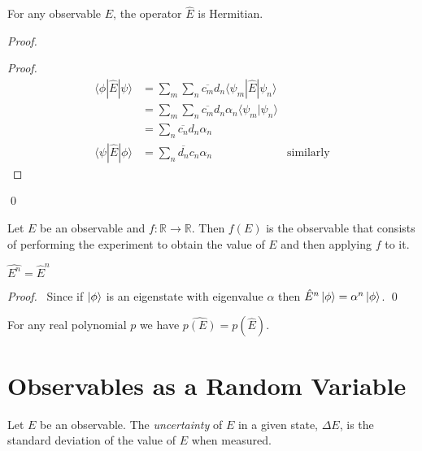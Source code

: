 \begin{prop}
For any observable $E$, the operator $\hat{E}$ is Hermitian.
\end{prop}

\begin{proof}
\pf
{}
\begin{proof}
	\pf
	\begin{align*}
		\langle \phi | \hat{E} | \psi \rangle
		& = \sum_m \sum_n \overline{c_m} d_n \langle \psi_m | \hat{E} | \psi_n \rangle \\
		& = \sum_m \sum_n \overline{c_m} d_n \alpha_n \langle \psi_m | \psi_n \rangle \\
		& = \sum_n \overline{c_n} d_n \alpha_n \\
		\langle \psi | \hat{E} | \phi \rangle & = \sum_n \overline{d_n} c_n \alpha_n & \text{similarly}
	\end{align*}
\end{proof}
\qed
\end{proof}

\begin{df}
Let $E$ be an observable and $f : \mathbb{R} \rightarrow \mathbb{R}$. Then $f(E)$ is the observable that consists of performing the experiment to obtain the value of $E$ and then applying $f$ to it.
\end{df}

\begin{prop}
$\widehat{E^n} = \hat{E}^n$
\end{prop}

\begin{proof}
\pf\ Since if $\left| {\phi} \right\rangle$ is an eigenstate with eigenvalue $\alpha$ then $\hat{E}^n \left| {\phi} \right\rangle = \alpha^n \left| {\phi} \right\rangle$. \qed
\end{proof}

\begin{cor}
For any real polynomial $p$ we have $\widehat{p(E)} = p(\hat{E})$.
\end{cor}

\section{Observables as a Random Variable}

\begin{df}[Uncertainty]
Let $E$ be an observable. The \emph{uncertainty} of $E$ in a given state, $\Delta E$, is the standard deviation of the value of $E$ when measured.
\end{df}

